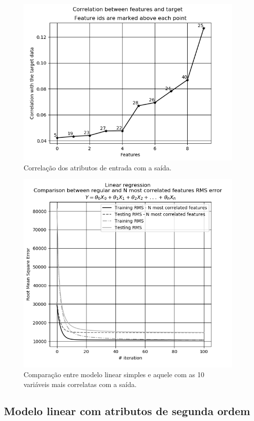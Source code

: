 \documentclass[10pt,twocolumn,letterpaper]{article}
\begin{document}
\begin{figure}
    \centering
    \includegraphics[width=0.9\columnwidth]{img/lr-selection.png}
    \caption{Correlação dos atributos de entrada com a saída.}
    \label{fig:correlation}
\end{figure}

\begin{figure}
    \centering
    \includegraphics[width=0.9\columnwidth]{img/lr-comparation-selection.png}
    \caption{Comparação entre modelo linear simples e aquele com as 10 variáveis mais correlatas com a saída.}
    \label{fig:comparison-selection}
\end{figure}

\subsection{Modelo linear com atributos de segunda ordem}
\end{document}
